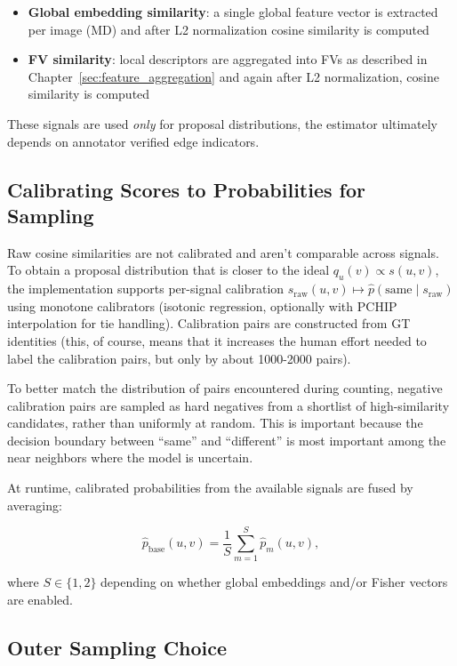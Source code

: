 \begin{itemize}
    \item \textbf{Global embedding similarity}: a single global feature vector is extracted per image (MD) and after L2 normalization cosine similarity is computed
    \item \textbf{FV similarity}: local descriptors are aggregated into FVs as described in Chapter~\ref{sec:feature_aggregation} and again after L2 normalization, cosine similarity is computed
\end{itemize}

These signals are used \emph{only} for proposal distributions, the estimator ultimately depends on annotator verified edge indicators.

\subsection{Calibrating Scores to Probabilities for Sampling}
\label{sec:counting_calibration}
Raw cosine similarities are not calibrated and aren't comparable across signals. To obtain a proposal distribution that is closer to the ideal \(q_u(v)\propto s(u,v)\), the implementation supports per-signal calibration \(s_{\text{raw}}(u,v)\mapsto \widehat{p}(\text{same}\mid s_{\text{raw}})\) using monotone calibrators (isotonic regression, optionally with PCHIP interpolation for tie handling). Calibration pairs are constructed from GT identities (this, of course, means that it increases the human effort needed to label the calibration pairs, but only by about 1000-2000 pairs). 

To better match the distribution of pairs encountered during counting, negative calibration pairs are sampled as hard negatives from a shortlist of high-similarity candidates, rather than uniformly at random. This is important because the decision boundary between ``same'' and ``different'' is most important among the near neighbors where the model is uncertain. 

At runtime, calibrated probabilities from the available signals are fused by averaging:

\begin{equation}
\widehat{p}_{\text{base}}(u,v)=\frac{1}{S}\sum_{m=1}^{S}\widehat{p}_m(u,v),
\label{eq:base_fused_probability}
\end{equation}

where \(S\in\{1,2\}\) depending on whether global embeddings and/or Fisher vectors are enabled.

\subsection{Outer Sampling Choice}

